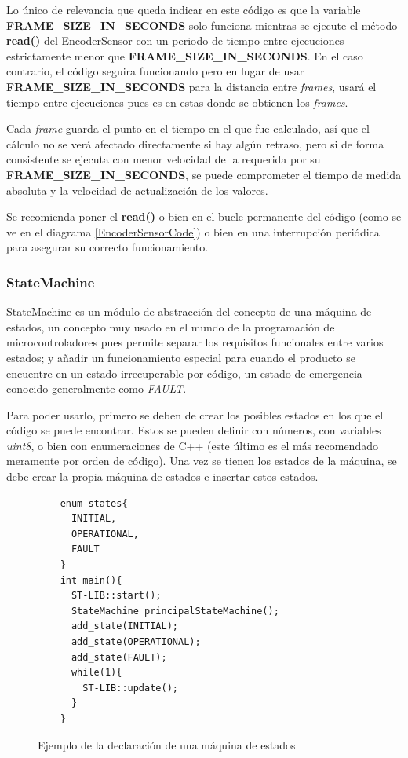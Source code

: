 \documentclass{report}
\begin{document}
\par \vspace{0.3cm}
Lo único de relevancia que queda indicar en este código es que la variable \textbf{FRAME\_SIZE\_IN\_SECONDS} solo funciona mientras se ejecute el método \textbf{read()} del EncoderSensor con un periodo de tiempo entre ejecuciones estrictamente menor que \textbf{FRAME\_SIZE\_IN\_SECONDS}. En el caso contrario, el código seguira funcionando pero en lugar de usar \textbf{FRAME\_SIZE\_IN\_SECONDS} para la distancia entre \textit{frames}, usará el tiempo entre ejecuciones pues es en estas donde se obtienen los \textit{frames}. \par
Cada \textit{frame} guarda el punto en el tiempo en el que fue calculado, así que el cálculo no se verá afectado directamente si hay algún retraso, pero si de forma consistente se ejecuta con menor velocidad de la requerida por su \textbf{FRAME\_SIZE\_IN\_SECONDS}, se puede comprometer el tiempo de medida absoluta y la velocidad de actualización de los valores. \par \vspace{0.3cm}
Se recomienda poner el \textbf{read()} o bien en el bucle permanente del código (como se ve en el diagrama \ref{EncoderSensorCode}) o bien en una interrupción periódica para asegurar su correcto funcionamiento. 

\subsubsection{StateMachine}
StateMachine es un módulo de abstracción del concepto de una máquina de estados, un concepto muy usado en el mundo de la programación de microcontroladores pues permite separar los requisitos funcionales entre varios estados; y añadir un funcionamiento especial para cuando el producto se encuentre en un estado irrecuperable por código, un estado de emergencia conocido generalmente como 
\textit{FAULT}. \par \vspace{0.3cm}
Para poder usarlo, primero se deben de crear los posibles estados en los que el código se puede encontrar. Estos se pueden definir con números, con variables \textit{uint8}, o bien con enumeraciones de C++ (este último es el más recomendado meramente por orden de código). Una vez se tienen los estados de la máquina, se debe crear la propia máquina de estados e insertar estos estados.
\begin{figure}[h]
  \begin{lstlisting}
    enum states{
      INITIAL,
      OPERATIONAL,
      FAULT
    }
    int main(){
      ST-LIB::start();
      StateMachine principalStateMachine();
      add_state(INITIAL);
      add_state(OPERATIONAL);
      add_state(FAULT);
      while(1){
        ST-LIB::update();
      }
    }
  \end{lstlisting}
  \caption{Ejemplo de la declaración de una máquina de estados}
  \label{StateMachineDefCode}
\end{figure}
\par \vspace{0.3cm}
\end{document}
